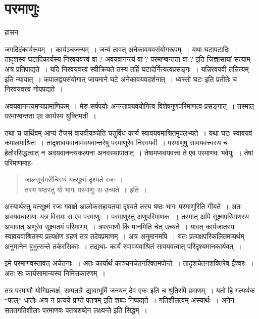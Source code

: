 {\fontsize{15}{17}\selectfont
\presetvalues
\chapter{परमाणुः}

\begin{center}
\smallskip
हासन
\addrule
\end{center}
जगदिदंकार्यरूपम्~। कार्यञ्चजन्यम्~। जन्यं तावत् अनेकावयवसंयोगरूपम्~। यथा घटापटादिः~। तादृशस्य घटादिकार्यस्य निरवयवत्त्वं वा ? अवयवानन्त्यं वा ? परमाण्वन्तता वा ? इति जिज्ञासायां सत्याम् अत्र प्रतिपाद्यते~। यदि निरवयवत्त्वं स्वीक्रियते तस्य तर्हि घटादेर्नित्यत्वप्रसङ्गः~। यन्निरवयवी तन्नित्यम् इति न्यायात्~। कपालद्वयसंयोगात् जायमाने घटे अनेकावयवदर्शनात्~। ध्वस्तो घटः इति प्रतीतेः च निरवयवत्त्वं नोपपद्यते~। 

अवयवानन्त्यमप्यप्रामाणिकम्~। मेरु-सर्षपयोः अनन्तावयवयोगित्व-विशेषगुणपरि\-माणत्व-प्रसङ्गात्~। तस्मात् परमाण्वन्तता एव कार्यस्य युक्तिमती~। 

तथा च पार्थिवम् आप्यं तैजसं वायवीयञ्चेति चतुर्विधं कार्यं स्वावयवमाश्रितमुपलभ्यते~। यथा घटः स्वावयवं कपालमाश्रितः~। तादृशावयवानामवयवान्तरेषु परमाणुरेव निरवयवी~। परमाणुषु सावयवत्त्वस्य च हेतोरसिद्धत्वात् न अवयवानन्त्यकल्पना अनवस्थापातात्~। तेषामप्यवयवत्त्व ते एव परमाणवः भवेयुः~। तेषां परिमाणमाह-
\begin{verse}
जालसूर्यमरीचिस्थं यत्सूक्ष्मं दृश्यते रजः~। \\
तस्य षष्ठस्तु यो भागः परमाणुः स उच्यते~॥ इति~। 
\end{verse}
अस्यार्थस्तु यत्सूक्ष्मं रजः गवाक्षे आलोकसहायतया दृश्यते तस्य षष्ठः भागः परमाणुरिति गीयते~। अतः अवयवधारायाः यत्र विरामः स एव परमाणुः~। परमाणुस्तु अणुपरिमाणकः~। तस्मात् अपि सूक्ष्मपरिमाणस्य अभावात् अणुरेव सूक्ष्मतमं परिमाणम्~। त्रपरमाणौ किं मानमिति चेत् उच्यते~। यावत् कार्यजातस्य स्वावयवाश्रितस्य प्रत्यक्षेण ग्रहणं तत्र तदेवप्रमाणम्~। अत्र अनुमानमपि~। यतः प्रत्यक्षपरिकलितमप्यर्थम् अनुमानेन बुभुत्सन्ते तर्करसिकाः~। तद्यथा- कार्यं स्वावयवाश्रितं सावयवत्वात् परिदृश्यमानकार्यवत्~। 

इमे परमाणवस्तावत् अचेतनाः~। अतः कार्यार्थं काञ्चनचेतनश्क्तिमपोन्ते~। तादृशचेतनशक्तिरेव ईश्वरः~। अतः सः कार्यसामान्यस्य निमित्तकारणम्~। 

तत्र परमाणौ योगिप्रत्यक्षं, सम्पतत्रैः द्यावाभूमिं जनयन् देव एकः इति च श्रुतिरपि प्रमाणम्~। यतो हि गत्यर्थक “पत्ल्” धातोः अत्र न प्रत्यये प्राप्ते पतत्रम् इति शब्दः निष्पद्यते~। गतिशीलत्वम् अस्यार्थः~। अनेन सततगतिशीलाः परमाणवः पतत्रशब्देन लक्ष्यन्ते इति सिद्धम्~। 

}
